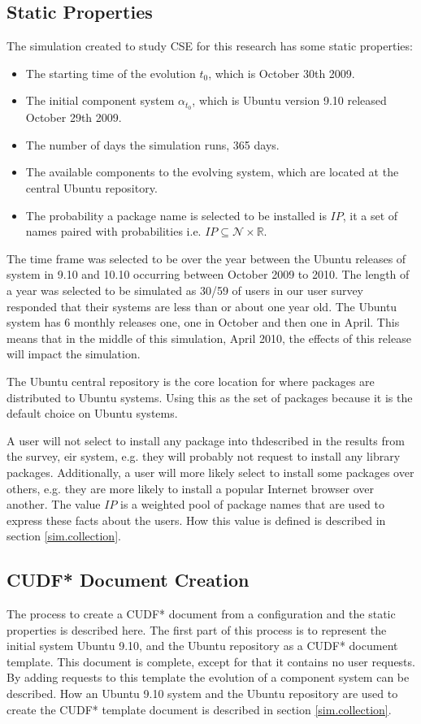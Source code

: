 \subsection{Static Properties}
The simulation created to study CSE for this research has some static properties:
\begin{itemize}
  \item The starting time of the evolution $t_0$, which is October 30th 2009.
  \item The initial component system $\alpha_{t_0}$, which is Ubuntu version 9.10 released October 29th 2009.
  \item The number of days the simulation runs, 365 days.
  \item The available components to the evolving system, which are located at the central Ubuntu repository.
  \item The probability a package name is selected to be installed is $IP$, it a set of names paired with probabilities i.e. $IP \subseteq \mathcal{N} \times \mathbb{R}$.
\end{itemize}

The time frame was selected to be over the year between the Ubuntu releases of system in 9.10 and 10.10 occurring between October 2009 to 2010.
The length of a year was selected to be simulated as 30/59 of users in our user survey responded that their systems are less than or about one year old.
The Ubuntu system has 6 monthly releases one, one in October and then one in April.
This means that in the middle of this simulation, April 2010, the effects of this release will impact the simulation.

The Ubuntu central repository is the core location for where packages are distributed to Ubuntu systems.
Using this as the set of packages because it is the default choice on Ubuntu systems.

A user will not select to install any package into thdescribed in the results from the survey, eir system, e.g. they will probably not request to install any library packages.
Additionally, a user will more likely select to install some packages over others, e.g. they are more likely to install a popular Internet browser over another.
The value $IP$ is a weighted pool of package names that are used to express these facts about the users.
How this value is defined is described in section \ref{sim.collection}.

\subsection{CUDF* Document Creation}
The process to create a CUDF* document from a configuration and the static properties is described here.
The first part of this process is to represent the initial system Ubuntu 9.10, and the Ubuntu repository as a CUDF* document template.
This document is complete, except for that it contains no user requests.
By adding requests to this template the evolution of a component system can be described.
How an Ubuntu 9.10 system and the Ubuntu repository are used to create the CUDF* template document is described in section \ref{sim.collection}.

